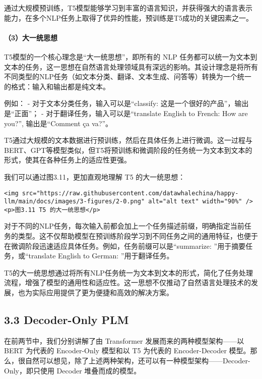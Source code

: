 \documentclass[
]{article}
\begin{document}
通过大规模预训练，T5模型能够学习到丰富的语言知识，并获得强大的语言表示能力，在多个NLP任务上取得了优异的性能，预训练是T5成功的关键因素之一。

\paragraph{（3）大一统思想}\label{ux5927ux4e00ux7edfux601dux60f3}

T5模型的一个核心理念是``大一统思想''，即所有的 NLP
任务都可以统一为文本到文本的任务，这一思想在自然语言处理领域具有深远的影响。其设计理念是将所有不同类型的NLP任务（如文本分类、翻译、文本生成、问答等）转换为一个统一的格式：输入和输出都是纯文本。

例如： - 对于文本分类任务，输入可以是``classify:
这是一个很好的产品''，输出是``正面''； -
对于翻译任务，输入可以是``translate English to French: How are you?'',
输出是``Comment ça va?''。

T5通过大规模的文本数据进行预训练，然后在具体任务上进行微调。这一过程与BERT、GPT等模型类似，但T5将预训练和微调阶段的任务统一为文本到文本的形式，使其在各种任务上的适应性更强。

我们可以通过图3.11，更加直观地理解 T5 的大一统思想：

\begin{verbatim}
<img src="https://raw.githubusercontent.com/datawhalechina/happy-llm/main/docs/images/3-figures/2-0.png" alt="alt text" width="90%" />
<p>图3.11 T5 的大一统思想</p>
\end{verbatim}

对于不同的NLP任务，每次输入前都会加上一个任务描述前缀，明确指定当前任务的类型。这不仅帮助模型在预训练阶段学习到不同任务之间的通用特征，也便于在微调阶段迅速适应具体任务。例如，任务前缀可以是``summarize:
''用于摘要任务，或``translate English to German: ''用于翻译任务。

T5的大一统思想通过将所有NLP任务统一为文本到文本的形式，简化了任务处理流程，增强了模型的通用性和适应性。这一思想不仅推动了自然语言处理技术的发展，也为实际应用提供了更为便捷和高效的解决方案。

\subsection{3.3 Decoder-Only PLM}\label{decoder-only-plm}

在前两节中，我们分别讲解了由 Transformer 发展而来的两种模型架构------以
BERT 为代表的 Encoder-Only 模型和以 T5 为代表的 Encoder-Decoder
模型。那么，很自然可以想见，除了上述两种架构，还可以有一种模型架构------Decoder-Only，即只使用
Decoder 堆叠而成的模型。
\end{document}
